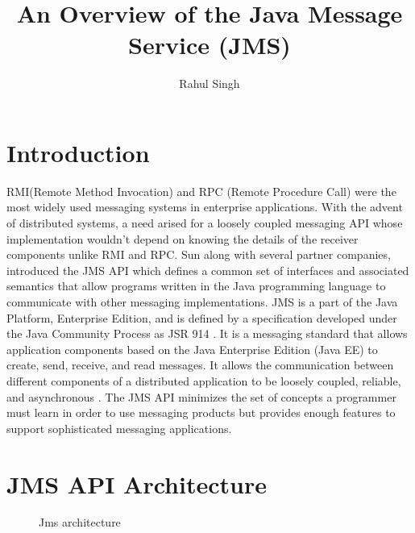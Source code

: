 \documentclass[9pt,twocolumn,twoside]{../../styles/osajnl}
\title{An Overview of the Java Message Service (JMS)}
\author[1]{Rahul Singh}
\affil[1]{School of Informatics and Computing, Bloomington, IN 47408, U.S.A.}
\affil[*]{Corresponding authors: rahpsing@iu.edu}
\begin{document}
\maketitle

\section{Introduction}

RMI(Remote Method Invocation) and RPC (Remote Procedure Call) were the
most widely used messaging systems in enterprise applications. With
the advent of distributed systems, a need arised for a loosely coupled
messaging API whose implementation wouldn't depend on knowing the
details of the receiver components unlike RMI and RPC. Sun along with
several partner companies, introduced the JMS API which defines a
common set of interfaces and associated semantics that allow programs
written in the Java programming language to communicate with other
messaging implementations. JMS is a part of the Java Platform,
Enterprise Edition, and is defined by a specification developed under
the Java Community Process as JSR 914 \cite{www-jms-javajsr}.  It is a
messaging standard that allows application components based on the
Java Enterprise Edition (Java EE) to create, send, receive, and read
messages. It allows the communication between different components of
a distributed application to be loosely coupled, reliable, and
asynchronous \cite{www-jms-oracle}. The JMS API minimizes the set of
concepts a programmer must learn in order to use messaging products
but provides enough features to support sophisticated messaging
applications.

\section{JMS API Architecture}

\begin{figure}[htbp]
\centering
{}
\caption{\cite{www-jms-tutorialoracle} Jms architecture}
\label{fig:JMS Objects}
\end{figure}
\end{document}
